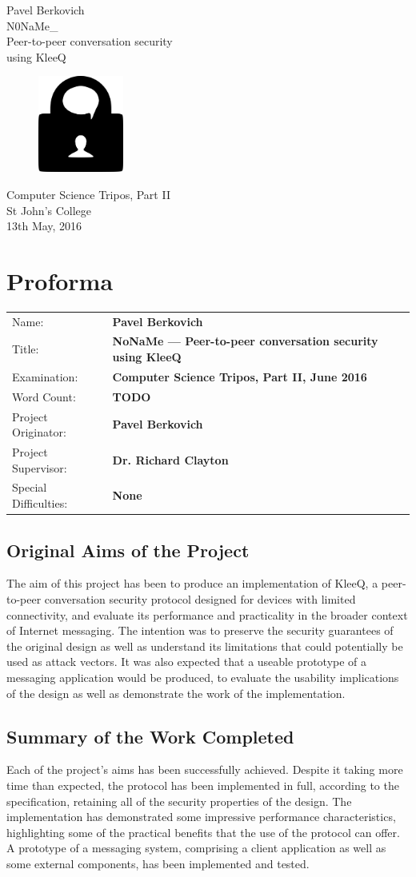 \documentclass[a4paper, twoside, 12pt]{report}
\newcommand{\funkytt}{\fontfamily{AnonymousPro}\selectfont}
\newcommand{\skippage}{\newpage\null\newpage}
\newcommand*{\titleTH}{ %
\begingroup
\raggedleft
\thispagestyle{empty}
\newgeometry{margin=2.5cm}
{\Large Pavel Berkovich}\\[0.167\textheight] \centering
{\huge{\funkytt N0NaMe\_}}\\[\baselineskip]
{\Large Peer-to-peer conversation security \\ using KleeQ} \\
\vspace{2.5cm}
\begin{figure}[h]
    \centering
    \includegraphics[width = 0.25\textwidth]{lock_chat.png.png} 
\end{figure}
\vspace{3cm}
{\large Computer Science Tripos, Part II}\\ \vspace{3mm}
{\large St John's College} \\ \vspace{3mm}
{\large 13th May, 2016}
\vfill
\clearpage
\endgroup}
\begin{document}
\titleTH

\raggedbottom

\skippage


\chapter*{Proforma}
\begin{tabular}{l >{\bfseries}l}
    Name: & Pavel Berkovich \\
    Title: & NoNaMe --- Peer-to-peer conversation security using KleeQ \\
    Examination: & Computer Science Tripos, Part II, June 2016 \\
    Word Count: & {\color{red} TODO} \\
    Project Originator: & Pavel Berkovich \\
    Project Supervisor: & Dr. Richard Clayton \\
    Special Difficulties: & None
\end{tabular}

\section*{Original Aims of the Project}
The aim of this project has been to produce an implementation of KleeQ, a peer-to-peer conversation security protocol designed for devices with limited connectivity, and evaluate its performance and practicality in the broader context of Internet messaging. The intention was to preserve the security guarantees of the original design as well as understand its limitations that could potentially be used as attack vectors. It was also expected that a useable prototype of a messaging application would be produced, to evaluate the usability implications of the design as well as demonstrate the work of the implementation.

\section*{Summary of the Work Completed}

Each of the project's aims has been successfully achieved. Despite it taking more time than expected, the protocol has been implemented in full, according to the specification, retaining all of the security properties of the design. The implementation has demonstrated some impressive performance characteristics, highlighting some of the practical benefits that the use of the protocol can offer. A prototype of a messaging system, comprising a client application as well as some external components, has been implemented and tested. \\
\end{document}
